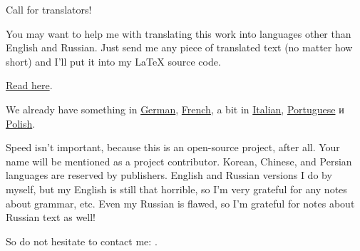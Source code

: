 \vspace*{\fill}

\Huge Call for translators!

\normalsize

\bigskip
\bigskip
\bigskip

You may want to help me with translating this work into languages other than English and Russian.
Just send me any piece of translated text (no matter how short) and I'll put it into my LaTeX source code.

\href{https://github.com/dennis714/RE-for-beginners/blob/master/Translation.md}{Read here}.

We already have something in \href{https://beginners.re/RE4B-DE.pdf}{German},
\href{https://beginners.re/RE4B-FR.pdf}{French}, a bit in
\href{https://yurichev.com/tmp/RE4B-IT-partial.pdf}{Italian},
\href{https://yurichev.com/tmp/RE4B-PTBR-lite2.pdf}{Portuguese} и
\href{https://yurichev.com/tmp/RE4B-PL.pdf}{Polish}.

Speed isn't important, because this is an open-source project, after all.
Your name will be mentioned as a project contributor.
Korean, Chinese, and Persian languages are reserved by publishers.
English and Russian versions I do by myself, but my English is still that horrible, so I'm very grateful for any notes about grammar, etc.
Even my Russian is flawed, so I'm grateful for notes about Russian text as well!%

So do not hesitate to contact me: \GTT{\EMAIL}.

\vspace*{\fill}
\vfill
